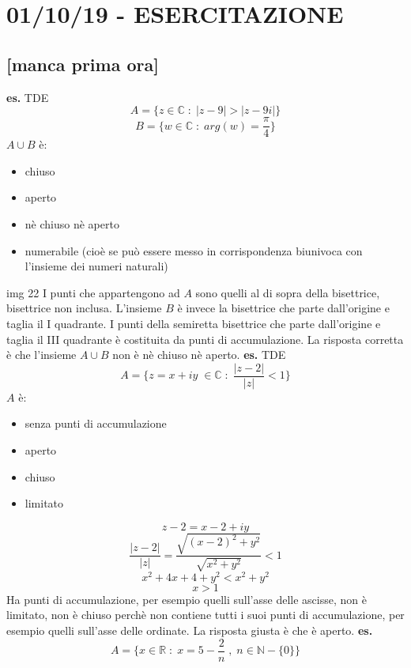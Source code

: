 \section*{01/10/19 - ESERCITAZIONE}
\subsection*{[manca prima ora]}
\textbf{es.} TDE
\[
    A = \{z \in \mathbb{C} \;:\; |z-9| > |z-9i|\}
\]
\[
    B=\{w \in \mathbb{C} \;:\; arg(w) = \frac{\pi}{4}\}
\]
 $A\cup B$ è:
\begin{itemize}
    \item chiuso
    \item aperto
    \item nè chiuso nè aperto
    \item numerabile (cioè se può essere messo in corrispondenza biunivoca con l'insieme dei numeri naturali)
\end{itemize}
img 22
\newline
I punti che appartengono ad $A$ sono quelli al di sopra della bisettrice, bisettrice non inclusa. L'insieme $B$ è invece la bisettrice che parte dall'origine e taglia il I quadrante.
\newline
I punti della semiretta bisettrice che parte dall'origine e taglia il III quadrante è costituita da punti di accumulazione.  
\newline
La risposta corretta è che l'insieme $A\cup B$ non è nè chiuso nè aperto.
\newline
\newline
\textbf{es.} TDE
\[
    A = \{z = x+iy \; \in \mathbb{C}\;:\; \frac{|z-2|}{|z|}<1 \}
\]
$A$ è:
\begin{itemize}
    \item senza punti di accumulazione
    \item aperto
    \item chiuso
    \item limitato
\end{itemize}
\[
    z-2 = x-2+iy
\]
\[
    \frac{|z-2|}{|z|} = \frac{\sqrt{(x-2)^2+y^2}}{\sqrt{x^2+y^2}}<1
\]
\[
    x^2 +4x +4 +y^2 < x^2+y^2
\]
\[
    x>1
\]
Ha punti di accumulazione, per esempio quelli sull'asse delle ascisse, non è limitato, non è chiuso perchè non contiene tutti i suoi punti di accumulazione, per esempio quelli sull'asse delle ordinate. La risposta giusta è che è aperto.
\newline
\newline
\textbf{es.} 
\[
    A = \{x \in \mathbb{R} \;:\; x = 5 -\frac{2}{n} \;,\; n \in \mathbb{N}-\{0\}\}
\]
